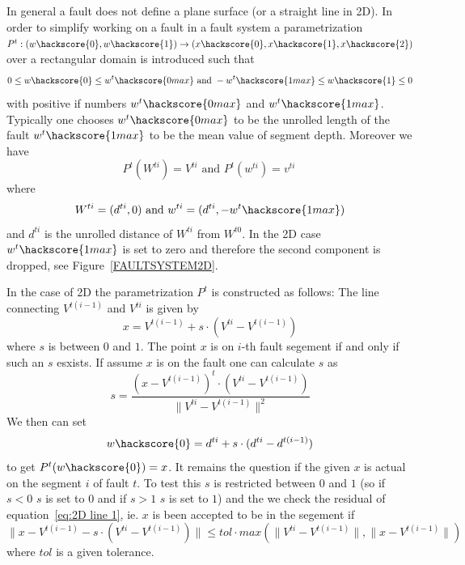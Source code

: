 In general a fault does not define a plane surface (or a straight line in 2D). In order to simplify working on 
a fault in a fault system a parametrization $P^t: (w\hackscore{0},w\hackscore{1}) \rightarrow (x\hackscore{0},x\hackscore{1},x\hackscore{2})$ over a rectangular domain is introduced such that 
\begin{equation}
0\le w\hackscore{0} \le w^t\hackscore{0 max} \mbox{ and }  -w^t\hackscore{1max}\le w\hackscore{1} \le 0
\label{eq:fault 1}
\end{equation}
with positive if numbers $w^t\hackscore{0 max}$ and $w^t\hackscore{1 max}$. Typically one chooses
$w^t\hackscore{0 max}$ to be the unrolled length of the fault
$w^t\hackscore{1 max}$ to be the mean value of segment depth. Moreover we have 
\begin{equation}
P^t(W^{ti})=V^{ti}\mbox{ and } P^t(w^{ti})=v^{ti}\
\label{eq:fault 2}
\end{equation}
where 
\begin{equation}
W^{ti}=(d^{ti},0) \mbox{ and } w^{ti}=(d^{ti},-w^t\hackscore{1 max})
\label{eq:fault 3}
\end{equation}
and $d^{ti}$ is the unrolled distance of $W^{ti}$ from $W^{t0}$. In the 2D case $w^t\hackscore{1 max}$ is set to zero and therefore the second component is dropped, see Figure~\ref{FAULTSYSTEM2D}.

In the case of 2D the parametrization $P^t$ is constructed as follows:
The line connecting $V^{t(i-1)}$ and $V^{ti}$ is given by
\begin{equation}
x=V^{t(i-1)} + s \cdot (V^{ti}-V^{t(i-1)})
\label{eq:2D line 1}
\end{equation}
where $s$ is between $0$ and $1$. The point $x$ is on $i$-th fault segement if and only if 
such an $s$ esxists. If assume $x$ is on the fault one can calculate $s$ as
\begin{equation}
s = \frac{ (x- V^{t(i-1)})^t \cdot (V^{ti}-V^{t(i-1)}) }{\|V^{ti}-V^{t(i-1)}\|^2} 
\label{eq:2D line 1b}
\end{equation}
We then can set
\begin{equation}
w\hackscore{0}=d^{ti}+s \cdot (d^{ti}-d^{t(i-1)})
\label{eq:2D line 2}
\end{equation}
to get $P^t(w\hackscore{0})=x$.
It remains the question if the given $x$ is actual on the segment $i$ of fault $t$. To test this $s$ is restricted 
between $0$ and $1$ (so if $s<0$ $s$ is set to $0$ and if $s>1$ $s$ is set to $1$) and the we check the 
residual of equation~\ref{eq:2D line 1}, ie. $x$ is been accepted to be in the segement if
\begin{equation}
\|x-V^{t(i-1)} - s \cdot (V^{ti}-V^{t(i-1)}) \| \le tol \cdot max(\|V^{ti}-V^{t(i-1)}\|, \|x-V^{t(i-1)} \|) 
\label{eq:2D line 3}
\end{equation}
where $tol$ is a given tolerance.

